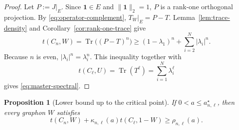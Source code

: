 \documentclass[11pt]{article}
\newtheorem{proposition}[theorem]{Proposition}
\theoremstyle{definition}
\theoremstyle{remark}
\newcommand{\one}{\mathbf{1}}
\newcommand{\tr}{\operatorname{Tr}}
\begin{document}
\begin{proof}
  Let $P:=J|_E$.  Since $\one\in E$ and $\|\one\|_2=1$, $P$ is a rank-one
  orthogonal projection.  By \eqref{eq:operator-complement},
  $T_W|_E=P-T$.  Lemma~\ref{lem:trace-density} and
  Corollary~\ref{cor:rank-one-trace} give
  \[
    t(C_n,W)
    =\tr\bigl((P-T)^n\bigr)
    \ge(1-\lambda_1)^n+
      \sum_{i=2}^N|\lambda_i|^n.
  \]
  Because $n$ is even, $|\lambda_i|^n=\lambda_i^n$.  This inequality together
  with
  \[
    t(C_\ell,U)=\tr(T^\ell)=\sum_{i=1}^N\lambda_i^\ell
  \]
  gives \eqref{eq:master-spectral}.
\end{proof}

\begin{proposition}[Lower bound up to the critical point]
  \label{prop:lower-bound}
  If $0<a\le a_{n,\ell}^{\star}$, then every graphon $W$ satisfies
  \begin{equation}
    t(C_n,W)+\kappa_{n,\ell}(a)t(C_\ell,1-W)
    \ge\rho_{n,\ell}(a).
    \label{eq:lower-bound}
  \end{equation}
\end{proposition}
\end{document}
